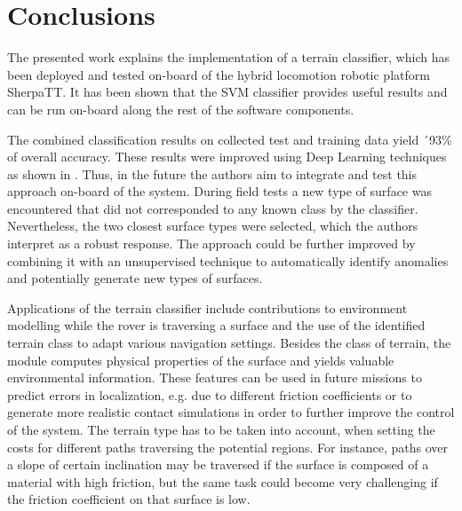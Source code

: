 
\section{Conclusions}

The presented work explains the implementation of a terrain classifier, which has been deployed and tested on-board of the hybrid locomotion robotic platform SherpaTT.
It has been shown that the SVM classifier provides useful results and can be run on-board along the rest of the software components.

The combined classification results on collected test and training data yield ´93\% of overall accuracy. 
These results were improved using Deep Learning techniques as shown in \cite{ugenti2021}. 
Thus, in the future the authors aim to integrate and test this approach on-board of the system.
During field tests a new type of surface was encountered that did not corresponded to any known class by the classifier. 
Nevertheless, the two closest surface types were selected, which the authors interpret as a robust response.
The approach could be further improved by combining it with an unsupervised technique to automatically identify anomalies and potentially generate new types of surfaces.

Applications of the terrain classifier include contributions to environment modelling while the rover is traversing a surface and the use of the identified terrain class to adapt various navigation settings.
Besides the  class of terrain, the module computes physical properties of the surface and yields valuable environmental information. 
These features can be used in future missions to predict errors in localization, e.g. due to different friction coefficients or to generate more realistic contact simulations in order to further improve the control of the system.
The terrain type has to be taken into account, when setting the costs for different paths traversing the potential regions. 
For instance, paths over a slope of certain inclination may be traversed if the surface is composed of a material with high friction, but the same task could become very challenging if the friction coefficient on that surface is low. 

